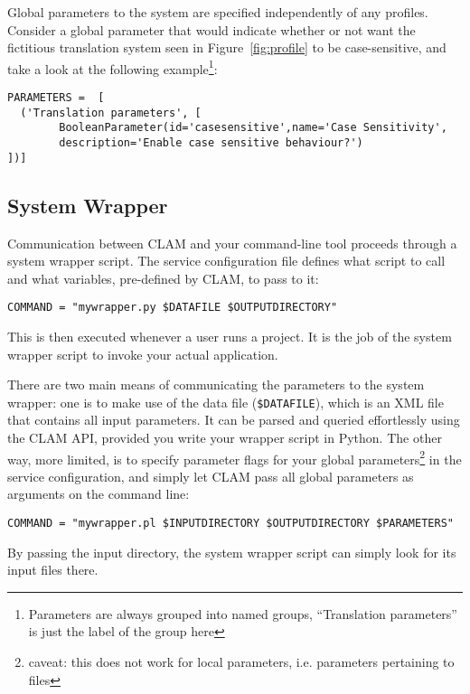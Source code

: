 \documentclass[11pt]{article}
\begin{document}
Global parameters to the system are specified independently of any profiles.
Consider a global parameter that would indicate whether or not want
the fictitious translation system seen in Figure~\ref{fig:profile} to be
case-sensitive, and take a look at the following example\footnote{Parameters are always grouped into named groups,
``Translation parameters'' is just the label of the group here}:

{\footnotesize{
\begin{verbatim}
PARAMETERS =  [
  ('Translation parameters', [
        BooleanParameter(id='casesensitive',name='Case Sensitivity',
        description='Enable case sensitive behaviour?') 
])]
\end{verbatim}
}}

\subsection{System Wrapper}

Communication between CLAM and your command-line tool proceeds through a system
wrapper script. The service configuration file defines what script to call and
what variables, pre-defined by CLAM, to pass to it:

{\footnotesize{
\begin{verbatim}
COMMAND = "mywrapper.py $DATAFILE $OUTPUTDIRECTORY"
\end{verbatim}
}}

This is then executed whenever a user runs a project. It is the job of the system wrapper script to
invoke your actual application. 

There are two main means of communicating the parameters to the system
wrapper: one is to make use of the data file (\texttt{\$DATAFILE}), which is an XML file
that contains all input parameters. It can be parsed and queried effortlessly using the
CLAM API, provided you write your wrapper script in Python. The other way, more
limited, is to specify parameter flags for your global parameters\footnote{caveat: this does not work for local
parameters, i.e. parameters pertaining to files} in the service configuration, and simply
let CLAM pass all global parameters as arguments on the command line:

{\footnotesize{
\begin{verbatim}
COMMAND = "mywrapper.pl $INPUTDIRECTORY $OUTPUTDIRECTORY $PARAMETERS"
\end{verbatim}
}}

By passing the input directory, the system wrapper script can simply look for 
its input files there.
\end{document}
